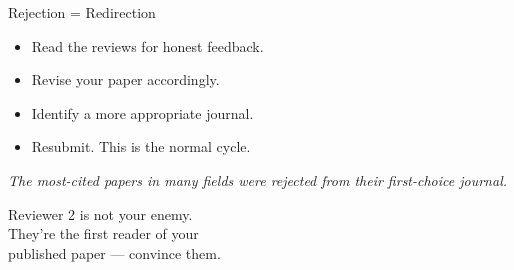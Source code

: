 \documentclass[aspectratio=169]{beamer}
\begin{document}
\begin{frame}{Rejection = Redirection}
  \begin{itemize}
    \item Read the reviews for honest feedback.
    \item Revise your paper accordingly.
    \item Identify a more appropriate journal.
    \item Resubmit. This is the normal cycle.
  \end{itemize}
  \vspace{0.3cm}
  \textit{The most-cited papers in many fields were rejected from their first-choice journal.}
\end{frame}

\begin{frame}[standout]
  Reviewer 2 is not your enemy.\\
  They're the first reader of your\\
  published paper --- convince them.
\end{frame}
\end{document}
